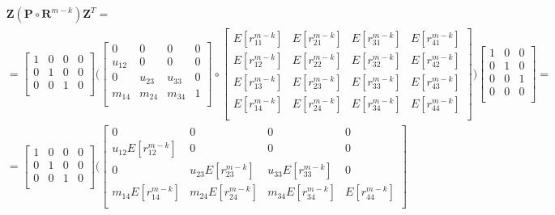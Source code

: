 \documentclass[\main/main.tex]{subfiles}
\begin{document}
 \begin{equation}
     \begin{split}
          & \mathbf{Z} (\mathbf{P} \circ \mathbf{R}^{m-k})\mathbf{Z}^T = \\
          &=
     \begin{bmatrix}
   1 & 0 & 0 & 0\\
    0 & 1 & 0 & 0\\
     0 & 0 & 1 & 0\\
    \end{bmatrix}
    \Bigg(
    \begin{bmatrix}
    0 & 0 & 0 & 0\\
    u_{12} & 0 & 0& 0\\
0 & u_{23} & u_{33}& 0\\
m_{14} & m_{24} & m_{34}& 1\\
    \end{bmatrix}
    \circ 
    \begin{bmatrix}
  E[r^{m-k}_{11}]  &  E[r^{m-k}_{21}]  &E[r^{m-k}_{31}]  & E[r^{m-k}_{41}] \\
  E[r^{m-k}_{12}]  &  E[r^{m-k}_{22}]  &E[r^{m-k}_{32}]  & E[r^{m-k}_{42}] \\
  E[r^{m-k}_{13}]  &  E[r^{m-k}_{23}]  &E[r^{m-k}_{33}]  & E[r^{m-k}_{43}] \\
    E[r^{m-k}_{14}]  &  E[r^{m-k}_{24}]  &E[r^{m-k}_{34}]  & E[r^{m-k}_{44}] \\
 \end{bmatrix}
 \Bigg)
       \begin{bmatrix}
    1 & 0 & 0\\
    0 & 1& 0\\
    0 & 0 & 1\\
    0 & 0 & 0\\
    \end{bmatrix} =\\
    &=
     \begin{bmatrix}
   1 & 0 & 0 & 0\\
    0 & 1 & 0 & 0\\
     0 & 0 & 1 & 0\\
    \end{bmatrix}
    \Bigg(
    \begin{bmatrix}
    0 & 0 & 0 & 0\\
    u_{12}E[r^{m-k}_{12}] & 0 & 0 & 0\\
    0 & u_{23}E[r^{m-k}_{23}] & u_{33}E[r^{m-k}_{33}] & 0\\
    m_{14} E[r^{m-k}_{14}] & m_{24}E[r^{m-k}_{24}] & m_{34}E[r^{m-k}_{34}] & E[r^{m-k}_{44}]\\

\end{bmatrix}
\end{split}
\end{equation}
\end{document}
